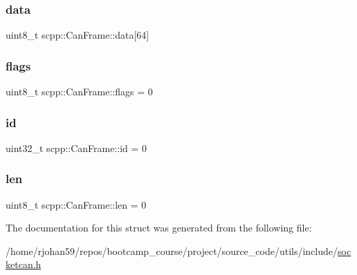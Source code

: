 \subsubsection{\texorpdfstring{data}{data}}
{\footnotesize\ttfamily uint8\+\_\+t scpp\+::\+Can\+Frame\+::data\mbox{[}64\mbox{]}}

\mbox{\label{structscpp_1_1CanFrame_a4b548ba3048832804bca2c05d6ee4787}} 
\subsubsection{\texorpdfstring{flags}{flags}}
{\footnotesize\ttfamily uint8\+\_\+t scpp\+::\+Can\+Frame\+::flags = 0}

\mbox{\label{structscpp_1_1CanFrame_a926c47e6fa4f8a2809b31ac85cc89b15}} 
\subsubsection{\texorpdfstring{id}{id}}
{\footnotesize\ttfamily uint32\+\_\+t scpp\+::\+Can\+Frame\+::id = 0}

\mbox{\label{structscpp_1_1CanFrame_ab949305fcfb1820ea8ca338bfad7fe6a}} 
\subsubsection{\texorpdfstring{len}{len}}
{\footnotesize\ttfamily uint8\+\_\+t scpp\+::\+Can\+Frame\+::len = 0}



The documentation for this struct was generated from the following file\+:\begin{DoxyCompactItemize}
\item 
/home/rjohan59/repos/bootcamp\+\_\+course/project/source\+\_\+code/utils/include/\hyperlink{socketcan_8h}{socketcan.\+h}\end{DoxyCompactItemize}
